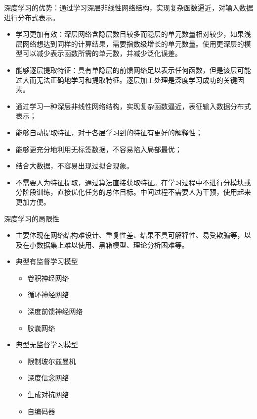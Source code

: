 \begin{note}
    深度学习的优势：通过学习深层非线性网络结构，实现复杂函数逼近，对输入数据进行分布式表示。
    \begin{itemize}
        \item 学习更加有效：深层网络含隐层数目较多而隐层的单元数量相对较少，如果浅层网络想达到同样的计算结果，需要\textcolor{main1}{指数级增长的单元数量}。使用更深层的模型可以减少表示函数所需的单元数，并减少泛化误差。
        \item 能够逐层提取特征：具有单隐层的前馈网络足以表示任何函数，但是该层\textcolor{main1}{可能过大而无法正确地学习和提取特征}。逐层加工处理是深度学习成功的关键因素。
        \item 通过学习一种深层非线性网络结构，实现复杂函数逼近，表征输入数据分布式表示；
        \item 能够自动提取特征，对于各层学习到的特征有更好的解释性；
        \item 能够更充分地利用无标签数据，不容易陷入局部最优；
        \item 结合大数据，不容易出现过拟合现象。
        \item 不需要人为特征提取，通过算法直接获取特征。在学习过程中不进行分模块或分阶段训练，直接优化任务的总体目标。中间过程不需要人为干预，使用起来更加方便。
    \end{itemize}
\end{note}

\begin{note}
    深度学习的局限性
    \begin{itemize}
        \item 主要体现在网络结构难设计、重复性差、结果不具可解释性、易受欺骗等，以及在小数据集上难以使用、黑箱模型、理论分析困难等。
    \end{itemize}
\end{note}
\begin{itemize}
    \item 典型有监督学习模型
    \begin{itemize}
        \item 卷积神经网络
        \item 循环神经网络
        \item 深度前馈神经网络
        \item 胶囊网络
    \end{itemize}
    \item 典型无监督学习模型
    \begin{itemize}
        \item 限制玻尔兹曼机
        \item 深度信念网络
        \item 生成对抗网络
        \item 自编码器
    \end{itemize}
\end{itemize}
